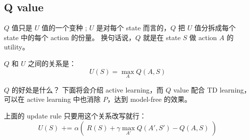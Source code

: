 \documentclass[orivec]{llncs}
\begin{document}
\subsection{Q value}

$Q$ 值只是 $U$ 值的一个变种 ;   $U$ 是对每个 state 而言的，$Q$ 把 $U$ 值分拆成每个 state 中的每个 action 的份量。  换句话说，$Q$ 就是在 state $S$ 做 action $A$ 的 utility。

$Q$ 和 $U$ 之间的关系是：
$$ U(S) = \max_A  Q(A, S) $$

$Q$ 的好处是什么？  下面将会介绍 active learning，而 $Q$ value  配合 TD learning，可以在 active learning 中也消除 $P$，达到 model-free 的效果。

上面的 update rule 只要用这个关系改写就行：
$$ U(S) \mbox{  +=  } \alpha ( \; R(S) + \gamma \max_{A'}  Q(A', S') - Q(A, S) \; ) $$

\end{document}
